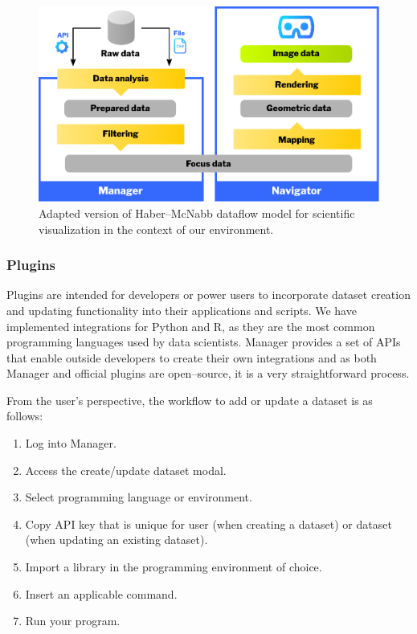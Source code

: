 \documentclass{article}
\begin{document}
\begin{figure}[!h]
\centering
\includegraphics[scale=0.5]{images/pipeline.pdf}
\caption{Adapted version of Haber–McNabb dataflow model for scientific visualization in the context of our environment.\cite{santos}}
\label{fig:dataflow}
\end{figure}

\subsubsection{Plugins}

Plugins are intended for developers or power users to incorporate dataset creation and updating functionality into their applications and scripts. We have implemented integrations for Python and R, as they are the most common programming languages used by data scientists. Manager provides a set of APIs that enable outside developers to create their own integrations and as both Manager and official plugins are open--source\cite{github}, it is a very straightforward process.\\

\newpage

From the user's perspective, the workflow to add or update a dataset is as follows:

\begin{enumerate}
    \item Log into Manager.
    \item Access the create/update dataset modal.
    \item Select programming language or environment.
    \item Copy API key that is unique for user (when creating a dataset) or dataset (when updating an existing dataset).
    \item Import a library in the programming environment of choice.
    \item Insert an applicable command.
    \item Run your program.
\end{enumerate}
\end{document}
